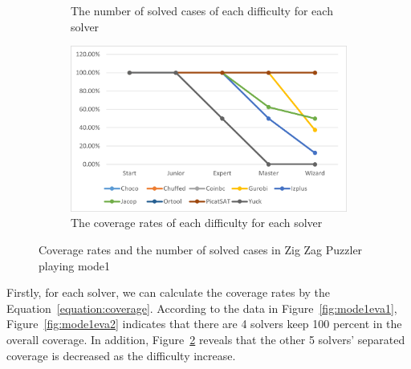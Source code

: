 \begin{figure}[htbp]
\begin{subfigure}[b]{0.48\textwidth}
    \caption{The number of solved cases of each difficulty for each solver}
    \label{fig:mode1eva3}
    \end{subfigure}
    \begin{subfigure}[b]{0.48\textwidth}
    \includegraphics[width=\textwidth]{figs/mode1seperatedcoverage.png}
    \caption{The coverage rates of each difficulty for each solver}
    \label{fig:mode1eva4}
    \end{subfigure}
    \caption{Coverage rates and the number of solved cases in Zig Zag Puzzler playing mode1}
    \label{fig:comparisonmode1}
\end{figure}
Firstly, for each solver, we can calculate the coverage rates by the Equation~\ref{equation:coverage}. According to the data in Figure~\ref{fig:mode1eva1}, Figure~\ref{fig:mode1eva2} indicates that there are 4 solvers keep 100 percent in the overall coverage. In addition, Figure~\ref{fig:mode1eva4} reveals that the other 5 solvers' separated coverage is decreased as the difficulty increase. 
